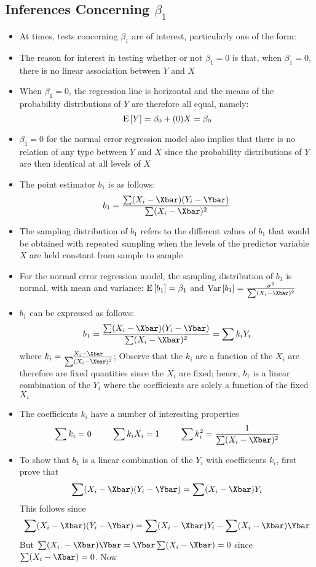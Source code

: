 \subsection{Inferences Concerning $\beta_1$}
\begin{itemize}
\item At times, tests concerning $\beta_1$ are of interest, particularly one of the form:  
\item The reason for interest in testing whether or not $\beta_1 = 0$ is that, when $\beta_1 = 0$, there is no linear association between $Y$ and $X$
\item When $\beta_1 = 0$, the regression line is horizontal and the means of the probability distributions of $Y$ are therefore all equal, namely: $$\mathrm{E}\left[ Y \right] = \beta_0 + (0)X = \beta_0 $$ 
\item $\beta_1 = 0$ for the normal error regression model also implies that there is no relation of any type between $Y$ and $X$ since the probability distributions of $Y$ are then identical at all levels of $X$
\item The point estimator $b_1$ is as follows: $$ b_1= \frac{\sum (X_i - \Xbar)(Y_i- \Ybar)}{\sum (X_i - \Xbar)^2} $$ 
\item The sampling distribution of $b_1$ refers to the different values of $b_1$ that would be obtained with repeated sampling when the levels of the predictor variable $X$ are held constant from sample to sample 
\item For the normal error regression model, the sampling distribution of $b_1$ is normal, with mean and variance: $\mathrm{E}\left[ b_1 \right] = \beta_1$ and $\var{b_1} = \frac{\sigma^2}{\sum (X_i - \Xbar)^2} $
\item $b_1$ can be expressed as follows: $$ b_1 = \frac{\sum (X_i - \Xbar)(Y_i - \Ybar)}{\sum (X_i - \Xbar)^2} = \sum k_iY_i $$ where $k_i = \frac{X_i - \Xbar}{\sum (X_i - \Xbar)^2} $; Observe that the $k_i$ are a function of the $X_i$ are therefore are fixed quantities since the $X_i$ are fixed; hence, $b_1$ is a linear combination of the $Y_i$ where the coefficients are solely a function of the fixed $X_i$
\item The coefficients $k_i$ have a number of interesting properties 
$$ \sum k_i = 0 ~~~~~~~ \sum k_iX_i = 1 ~~~~~~~ \sum k_i^2 = \frac{1}{\sum (X_i - \Xbar)^2} $$ 
\item To show that $b_1$ is a linear combination of the $Y_i$ with coefficients $k_i$, first prove that $$ \sum (X_i - \Xbar)(Y_i - \Ybar) = \sum (X_i - \Xbar)Y_i $$ This follows since $$ \sum (X_i - \Xbar)(Y_i - \Ybar) = \sum (X_i - \Xbar)Y_i - \sum (X_i - \Xbar)\Ybar $$ But $\sum (X_i. - \Xbar)\Ybar = \Ybar \sum (X_i - \Xbar) = 0$ since $\sum (X_i - \Xbar) = 0$. Now 

\end{itemize}
